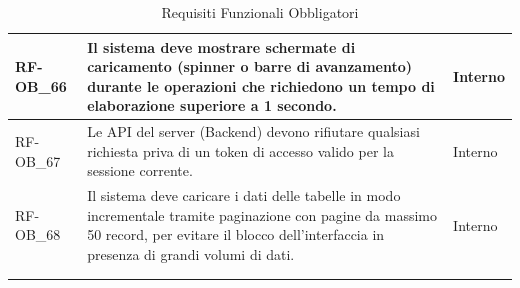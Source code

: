 \begin{longtable}{|>{\raggedright}p{}|>{\raggedright\arraybackslash}p{}|>{\raggedright\arraybackslash}p{}|}
    \hline
    RF-OB\_66 \hypertarget{rf-ob_66} & Il sistema deve mostrare schermate di caricamento (spinner o barre di avanzamento) durante le operazioni che richiedono un tempo di elaborazione superiore a 1 secondo. & Interno \\
    \hline
    RF-OB\_67 \hypertarget{rf-ob_67} & Le API del server (Backend) devono rifiutare qualsiasi richiesta priva di un token di accesso valido per la sessione corrente. & Interno \\
    \hline
    RF-OB\_68 \hypertarget{rf-ob_68} & Il sistema deve caricare i dati delle tabelle in modo incrementale tramite paginazione con pagine da massimo 50 record, per evitare il blocco dell'interfaccia in presenza di grandi volumi di dati. & Interno \\
    \hline
    \multicolumn{3}{c}{} \\
    \caption{Requisiti Funzionali Obbligatori}\hypertarget{tab:funzionali_obbligatori}\\
\end{longtable}

